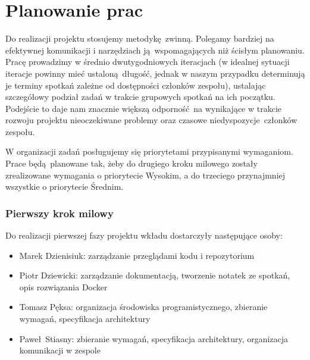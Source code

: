 \documentclass[a4paper,11pt]{article}
\begin{document}
\part{Planowanie prac}
Do realizacji projektu stosujemy metodykę zwinną.  Polegamy bardziej na
efektywnej komunikacji i narzędziach ją wspomagających niż ścisłym
planowaniu.  Pracę prowadzimy w średnio dwutygodniowych iteracjach (w
idealnej sytuacji iteracje powinny mieć ustaloną długość, jednak w
naszym przypadku determinują je terminy spotkań zależne od dostępności
członków zespołu), ustalając szczegółowy podział zadań w trakcie
grupowych spotkań na ich początku.  Podejście to daje nam znacznie
większą odporność na wynikające w trakcie rozwoju projektu nieoczekiwane
problemy oraz czasowe niedyspozycje członków zespołu.

W organizacji zadań posługujemy się priorytetami przypisanymi wymaganiom.
Prace będą planowane tak, żeby do drugiego kroku milowego zostały
zrealizowane wymagania o priorytecie Wysokim, a do trzeciego
przynajmniej wszystkie o priorytecie Średnim.

\section{Pierwszy krok milowy}
Do realizacji pierwszej fazy projektu wkładu dostarczyły następujące
osoby:
\begin{itemize}
  \item Marek Dzienisiuk: zarządzanie przeglądami kodu i repozytorium
  \item Piotr Dziewicki: zarządzanie dokumentacją, tworzenie notatek ze
      spotkań, opis rozwiązania Docker
  \item Tomasz Pęksa: organizacja środowiska programistycznego,
      zbieranie wymagań, specyfikacja architektury
  \item Paweł Stiasny: zbieranie wymagań, specyfikacja architektury,
      organizacja komunikacji w zespole
\end{itemize}
\end{document}
